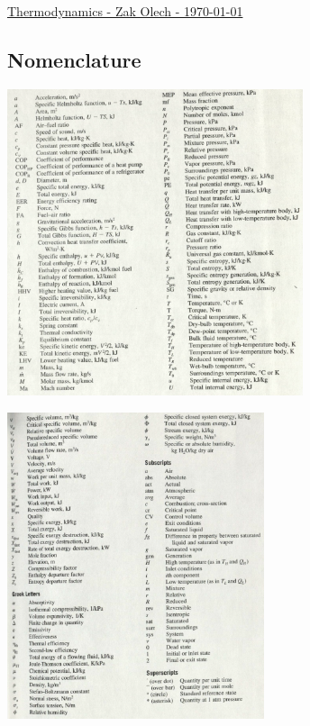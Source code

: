 \documentclass[10pt,landscape]{article}
\newenvironment{Figure}
     {\par\medskip\noindent\minipage{\linewidth}}
     {\endminipage\par\medskip}
\begin{document}
\raggedright
\footnotesize

\begin{center}
     \Large{\underline{Thermodynamics - Zak Olech - \today}}
\end{center}
\begin{multicols}{3}

\setlength{\columnseprule}{0.25pt}
\setlength{\premulticols}{1pt}
\setlength{\postmulticols}{1pt}
\setlength{\multicolsep}{1pt}
\setlength{\columnsep}{2pt}

\section{Nomenclature}
\begin{Figure}
    \centering
    \includegraphics[width=\linewidth, height=9cm]{Nomenclature_1.png}
\end{Figure}
\begin{Figure}
    \centering
    \includegraphics[width=\linewidth, height=9cm]{Nomenclature_2.png}
\end{Figure}


\end{multicols}
\end{document}
